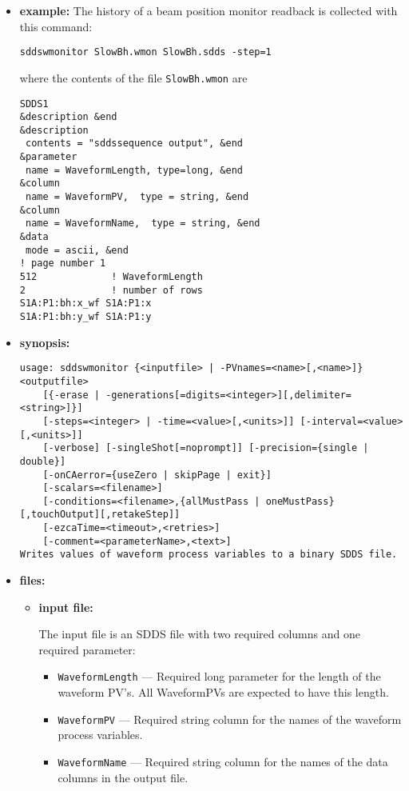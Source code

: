 \begin{itemize}
\item {\bf example:} 
%
% 
%
The history of a beam position monitor readback is collected with this command:
\begin{verbatim}
sddswmonitor SlowBh.wmon SlowBh.sdds -step=1
\end{verbatim}
where the contents of the file \verb+SlowBh.wmon+ are
\begin{verbatim}
SDDS1
&description &end
&description
 contents = "sddssequence output", &end
&parameter
 name = WaveformLength, type=long, &end
&column
 name = WaveformPV,  type = string, &end
&column
 name = WaveformName,  type = string, &end
&data
 mode = ascii, &end
! page number 1
512             ! WaveformLength
2               ! number of rows
S1A:P1:bh:x_wf S1A:P1:x
S1A:P1:bh:y_wf S1A:P1:y
\end{verbatim}
\item {\bf synopsis:} 
%
%
\begin{verbatim}
usage: sddswmonitor {<inputfile> | -PVnames=<name>[,<name>]} <outputfile>
    [{-erase | -generations[=digits=<integer>][,delimiter=<string>]}]
    [-steps=<integer> | -time=<value>[,<units>]] [-interval=<value>[,<units>]]
    [-verbose] [-singleShot[=noprompt]] [-precision={single | double}]
    [-onCAerror={useZero | skipPage | exit}] 
    [-scalars=<filename>]
    [-conditions=<filename>,{allMustPass | oneMustPass}[,touchOutput][,retakeStep]]
    [-ezcaTime=<timeout>,<retries>] 
    [-comment=<parameterName>,<text>]
Writes values of waveform process variables to a binary SDDS file.
\end{verbatim}
\item {\bf files:}
\begin{itemize}
\item {\bf input file:}\par
The input file is an SDDS file with two required columns and one required parameter:
\begin{itemize}
        \item {\verb+WaveformLength+} --- Required long parameter for the length of the waveform PV's. All
                WaveformPVs are expected to have this length. 
        \item {\verb+WaveformPV+}  --- Required string column for the names of the waveform process variables.
        \item {\verb+WaveformName+} --- Required string column for the names of the data columns in the output file.
\end{itemize}


\end{itemize}
\end{itemize}
